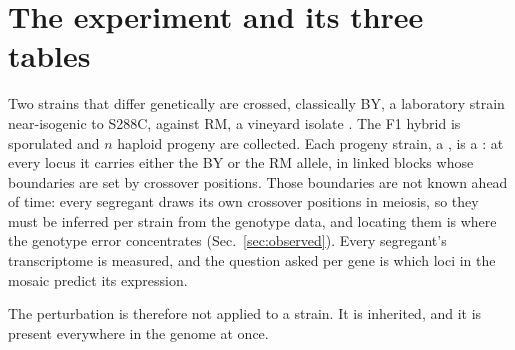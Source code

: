 
\section{The experiment and its three tables}\label{sec:what}

Two strains that differ genetically are crossed, classically BY, a laboratory strain
near-isogenic to S288C, against RM, a vineyard isolate
\citep{bremGeneticDissectionTranscriptional2002}. The F1 hybrid is sporulated and
$n$ haploid progeny are collected. Each progeny strain, a , is a
: at every locus it carries either the BY or the RM allele, in linked
blocks whose boundaries are set by crossover positions. Those boundaries are not known
ahead of time: every segregant draws its own crossover positions in meiosis, so they must
be inferred per strain from the genotype data, and locating them is where the genotype
error concentrates (Sec.~\ref{sec:observed}). Every segregant's transcriptome is
measured, and the question asked per gene is which loci in the mosaic predict its
expression.

The perturbation is therefore not applied to a strain. It is inherited, and it is present
everywhere in the genome at once.

